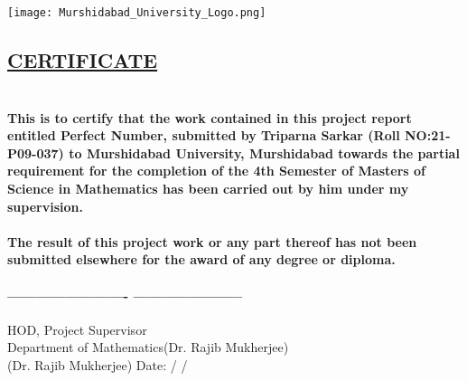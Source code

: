\documentclass[12pt,,a4paper]{article}
\begin{document}
\begin{center}
    
\texttt{[image: Murshidabad\_University\_Logo.png]}
\end{center}

\begin{center}
    
\section*{\color{blue}\underline {CERTIFICATE}}
\end{center}
\thispagestyle{empty}
\section*{}

\paragraph{
This is to certify that the work contained in this project report entitled \textbf{Perfect Number}, submitted by Triparna Sarkar (Roll NO:21-P09-037) to Murshidabad University, Murshidabad towards the partial requirement for the completion of the 4th Semester of Masters of Science in Mathematics has been carried out by him under my supervision. 
}
\paragraph{
The result of this project work or any part thereof has not been submitted elsewhere for the award of any degree or diploma.
} 




\paragraph{------------------------- \hspace{5cm}-----------------------
}
\vspace{1.5cm}

HOD, \hspace{8cm} Project Supervisor \\ Department of Mathematics\hspace{4cm}(Dr. Rajib Mukherjee)  \\ (Dr. Rajib Mukherjee)\hspace{5cm} Date:   /\hspace{0.5cm}   /
\vspace{1.5cm}
\end{document}
